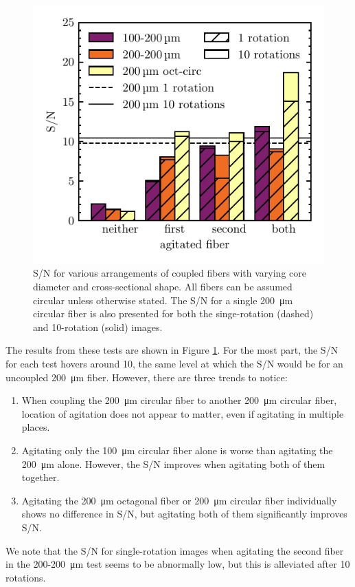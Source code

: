 \begin{figure}
\centering
	\includegraphics[width=\columnwidth]{figures-2/coupled_fibers.pdf}
	\caption{S/N for various arrangements of coupled fibers with varying core diameter and cross-sectional shape. All fibers can be assumed circular unless otherwise stated. The S/N for a single \SI{200}{\micro\meter} circular fiber is also presented for both the singe-rotation (dashed) and 10-rotation (solid) images.}
\label{fig:coupled_fibers}
\end{figure}

The results from these tests are shown in Figure \ref{fig:coupled_fibers}. For the most part, the S/N for each test hovers around 10, the same level at which the S/N would be for an uncoupled \SI{200}{\micro\meter} fiber. However, there are three trends to notice:
\begin{enumerate}
\item When coupling the \SI{200}{\micro\meter} circular fiber to another \SI{200}{\micro\meter} circular fiber, location of agitation does not appear to matter, even if agitating in multiple places.
\item Agitating only the \SI{100}{\micro\meter} circular fiber alone is worse than agitating the \SI{200}{\micro\meter} alone. However, the S/N improves when agitating both of them together.
\item Agitating the \SI{200}{\micro\meter} octagonal fiber or \SI{200}{\micro\meter} circular fiber individually shows no difference in S/N, but agitating both of them significantly improves S/N.
\end{enumerate}
We note that the S/N for single-rotation images when agitating the second fiber in the 200-\SI{200}{\micro\meter} test seems to be abnormally low, but this is alleviated after 10 rotations.

